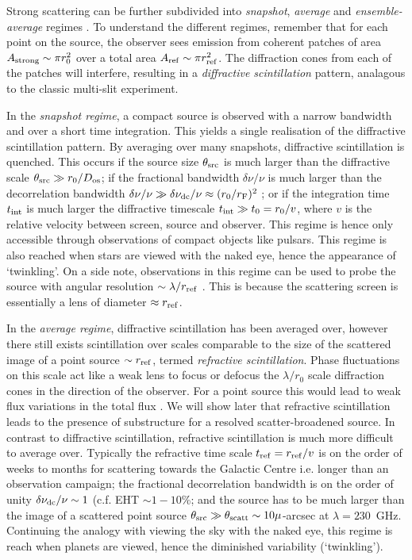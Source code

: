Strong scattering can be further subdivided into \emph{snapshot}, \emph{average} and \emph{ensemble-average} regimes \citep*{Narayan_1989,Goodman_1989}. To understand the different regimes, remember that for each point on the source, the observer sees emission from coherent patches of area $A_{\rm strong} \sim \pi r_0^2$ over a total area $A_{\rm ref} \sim \pi r_{\rm ref}^2$. The diffraction cones from each of the patches will interfere, resulting in a \emph{diffractive scintillation} pattern, analagous to the classic multi-slit experiment. 

In the \emph{snapshot regime}, a compact source is observed with a narrow bandwidth and over a short time integration. This yields a single realisation of the diffractive scintillation pattern. By averaging over many snapshots, diffractive scintillation is quenched. This occurs if the source size $\theta_{\rm src}$ is much larger than the diffractive scale $\theta_{\rm src} \gg r_0/D_{\rm os}$; if the fractional bandwidth $\delta \nu/\nu$ is much larger than the decorrelation bandwidth $\delta \nu/\nu \gg \delta \nu_{\rm dc}/\nu \approx (r_0/r_{\rm F})^2$ \citep{Narayan_1992}; or if the integration time $t_{\rm int}$ is much larger the diffractive timescale $t_{\rm int} \gg t_{\rm 0} = r_0/v$, where $v$ is the relative velocity between screen, source and observer. This regime is hence only accessible through observations of compact objects like pulsars. This regime is also reached when stars are viewed with the naked eye, hence the appearance of `twinkling'. On a side note, observations in this regime can be used to probe the source with angular resolution $\sim \lambda /r_{\rm ref}$ \citep[e.g.][]{Gwinn_2012}. This is because the scattering screen is essentially a lens of diameter $\approx r_{\rm ref}$.

In the \emph{average regime}, diffractive scintillation has been averaged over, however there still exists scintillation over scales comparable to the size of the scattered image of a point source $\sim r_{\rm ref}$, termed \emph{refractive scintillation}. Phase fluctuations on this scale act like a weak lens to focus or defocus the $\lambda/ r_0$ scale diffraction cones in the direction of the observer. For a point source this would lead to weak flux variations in the total flux \citep{Narayan_1992}. We will show later that refractive scintillation leads to the presence of substructure for a resolved scatter-broadened source. In contrast to diffractive scintillation, refractive scintillation is much more difficult to average over. Typically the refractive time scale $t_{\rm ref} = r_{\rm ref}/v$ is on the order of weeks to months for scattering towards the Galactic Centre i.e. longer than an observation campaign; the fractional decorrelation bandwidth is on the order of unity $\delta \nu_{\rm dc}/\nu \sim 1$ (c.f. EHT $\sim 1-10$\%; and the source has to be much larger than the image of a scattered point source $\theta_{\rm src} \gg \theta_{\rm scatt} \sim 10 \mu$-arcsec at $\lambda = 230$~GHz. Continuing the analogy with viewing the sky with the naked eye, this regime is reach when planets are viewed, hence the diminished variability (`twinkling'). 

